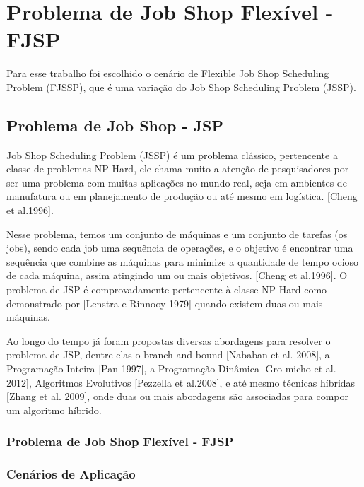 

\section{Problema de Job Shop Flexível - FJSP}
Para esse trabalho foi escolhido o cenário de Flexible Job Shop  Scheduling Problem (FJSSP), que é uma variação do Job Shop  Scheduling Problem (JSSP).

\subsection{Problema de Job Shop - JSP} 
Job Shop Scheduling Problem (JSSP) é um problema clássico, pertencente a classe de problemas NP-Hard, ele chama muito a atenção de pesquisadores por ser uma problema com muitas aplicações no mundo real, seja em ambientes de manufatura ou em planejamento de produção ou até mesmo em logística. [Cheng et al.1996].\newline

Nesse problema, temos um conjunto de máquinas e um conjunto de tarefas (os jobs), sendo cada job uma sequência de operações, e o objetivo é encontrar uma sequência que combine as máquinas para minimize a quantidade de tempo ocioso de cada máquina, assim atingindo um ou mais objetivos. [Cheng et al.1996]. O problema de JSP é comprovadamente pertencente à classe NP-Hard como demonstrado por [Lenstra e Rinnooy 1979] quando existem duas ou mais máquinas. \newline

Ao longo do tempo já foram propostas diversas abordagens para resolver o problema de JSP, dentre elas o branch and bound [Nababan et al. 2008], a Programação Inteira [Pan 1997], a Programação Dinâmica [Gro-micho et al. 2012], Algoritmos Evolutivos [Pezzella et al.2008], e até mesmo técnicas híbridas [Zhang et al. 2009], onde duas ou mais abordagens são associadas para compor um algoritmo híbrido.\newline

\subsubsection{Problema de Job Shop Flexível - FJSP}
\lipsum[3]

\subsubsection{Cenários de Aplicação}
\lipsum[3]

